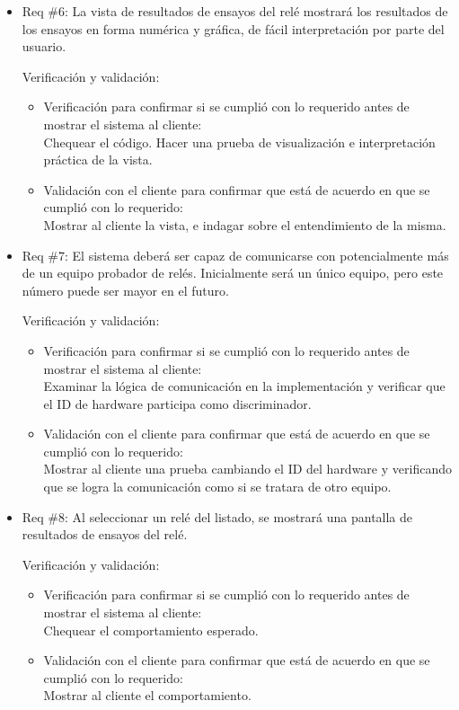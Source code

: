 \documentclass[11pt]{charter}
\begin{document}
\begin{itemize}
\item Req \#6: La vista de resultados de ensayos del relé mostrará los resultados de los ensayos en forma numérica y gráfica, de fácil interpretación por parte del usuario.

Verificación y validación:

\begin{itemize}
\item Verificación para confirmar si se cumplió con lo requerido antes de mostrar el sistema al cliente:\\
Chequear el código. Hacer una prueba de visualización e interpretación práctica de la vista.
\item Validación con el cliente para confirmar que está de acuerdo en que se cumplió con lo requerido:\\
Mostrar al cliente la vista, e indagar sobre el entendimiento de la misma.
\end{itemize}


\item Req \#7: El sistema deberá ser capaz de comunicarse con potencialmente más de un equipo probador de relés. Inicialmente será un único equipo, pero este número puede ser mayor en el futuro.

Verificación y validación:

\begin{itemize}
\item Verificación para confirmar si se cumplió con lo requerido antes de mostrar el sistema al cliente:\\
Examinar la lógica de comunicación en la implementación y verificar que el ID de hardware participa como discriminador.
\item Validación con el cliente para confirmar que está de acuerdo en que se cumplió con lo requerido:\\
Mostrar al cliente una prueba cambiando el ID del hardware y verificando que se logra la comunicación como si se tratara de otro equipo.
\end{itemize}


\item Req \#8: Al seleccionar un relé del listado, se mostrará una pantalla de resultados de ensayos del relé.

Verificación y validación:

\begin{itemize}
\item Verificación para confirmar si se cumplió con lo requerido antes de mostrar el sistema al cliente:\\
Chequear el comportamiento esperado.
\item Validación con el cliente para confirmar que está de acuerdo en que se cumplió con lo requerido:\\
Mostrar al cliente el comportamiento.
\end{itemize}



\end{itemize}
\end{document}
